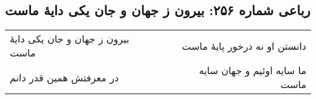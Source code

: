 \begin{center}
\section*{رباعی شماره ۲۵۶: بیرون ز جهان و جان یکی دایهٔ ماست}
\label{sec:0256}
\begin{longtable}{l p{0.5cm} r}
بیرون ز جهان و جان یکی دایهٔ ماست
&&
دانستن او نه درخور پایهٔ ماست
\\
در معرفتش همین قدر دانم
&&
ما سایه اوئیم و جهان سایه ماست
\\
\end{longtable}
\end{center}
